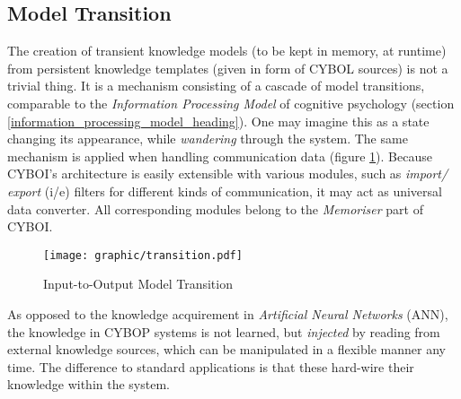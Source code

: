 %
%
%
%
%
%
%

\subsection{Model Transition}
\label{model_transition_heading}

The creation of transient knowledge models (to be kept in memory, at runtime)
from persistent knowledge templates (given in form of CYBOL sources) is not a
trivial thing. It is a mechanism consisting of a cascade of model transitions,
comparable to the \emph{Information Processing Model} of cognitive psychology
(section \ref{information_processing_model_heading}). One may imagine this as a
state changing its appearance, while \emph{wandering} through the system. The
same mechanism is applied when handling communication data (figure
\ref{transition_figure}). Because CYBOI's architecture is easily extensible
with various modules, such as \emph{import/ export} (i/e) filters for different
kinds of communication, it may act as universal data converter. All
corresponding modules belong to the \emph{Memoriser} part of CYBOI.

\begin{figure}[ht]
    \begin{center}
        \texttt{[image: graphic/transition.pdf]}
        \caption{Input-to-Output Model Transition}
        \label{transition_figure}
    \end{center}
\end{figure}

As opposed to the knowledge acquirement in \emph{Artificial Neural Networks}
(ANN),
the knowledge in CYBOP
systems is not learned, but \emph{injected} by reading from external knowledge
sources, which can be manipulated in a flexible manner any time. The difference
to standard applications is that these hard-wire their knowledge within the
system.

